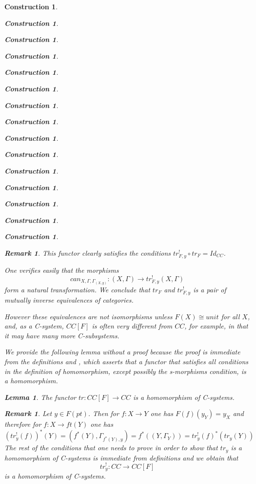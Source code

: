 \documentclass[onecolumn,12pt]{amsart}
\newtheorem{lemma}[proposition]{Lemma}
\newtheorem{remark}[proposition]{Remark}
\numberwithin{proposition}{subsection}
\newtheorem{construction}[proposition]{Construction}
\newcommand{\sr}{\rightarrow}
\begin{document}
\begin{construction}
\begin{construction}
\begin{construction}
\begin{construction}
\begin{construction}
\begin{construction}
\begin{construction}
\begin{construction}
\begin{construction}
\begin{construction}
\begin{construction}
\begin{construction}
\begin{construction}
\begin{construction}
\begin{construction}
\begin{remark}
This functor clearly satisfies the conditions $tr^!_{F,y}\circ tr_F=Id_{CC}$.

One verifies easily that the morphisms 
%
$$can_{X,\Gamma,\Gamma_{(X,y)}}:(X,\Gamma)\sr tr^!_{F,y}(X,\Gamma)$$
%
form a natural transformation. We conclude that $tr_F$ and $tr^!_{F,y}$ is a
pair of mutually inverse equivalences of categories.

However these equivalences are not isomorphisms unless $F(X)\cong unit$ for all
$X$, and, as a C-system, $CC[F]$ is often very different from $CC$, for example,
in that it may have many more C-subsystems.
\end{remark}
%
We provide the following lemma without a proof because the proof is immediate
from the definitions and \cite[Lemma 3.4]{Cfromauniverse}, which asserts that a
functor that satisfies all conditions in the definition of homomorphism,
except possibly the s-morphisms condition, is a homomorphism.
%
\begin{lemma}
\label{2015.08.22.l4}
The functor $tr:CC[F]\sr CC$ is a homomorphism of C-systems.
\end{lemma}
%
\begin{remark}\rm
\label{2015.08.22.rem1} 
Let $y\in F(pt)$. Then for $f:X\sr Y$ one has $F(f)(y_{Y})=y_X$ and therefore for $f:X\sr ft(Y)$ one has
%
$$(tr^!_{y}(f))^*(Y)=(f^*(Y),\Gamma_{f^*(Y),y})=f^*((Y,\Gamma_Y))=tr^!_y(f)^*(tr_y(Y))$$
%
The rest of the conditions that one needs to prove in order to show that $tr_y$
is a homomorphism of C-systems is immediate from definitions and we obtain that
%
$$tr^!_y:CC\sr CC[F]$$
%
is a homomorphism of C-systems.  
\end{remark}
%


\end{construction}
\end{construction}
\end{construction}
\end{construction}
\end{construction}
\end{construction}
\end{construction}
\end{construction}
\end{construction}
\end{construction}
\end{construction}
\end{construction}
\end{construction}
\end{construction}
\end{construction}
\end{document}

